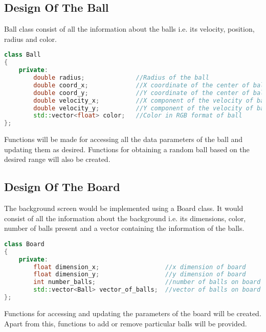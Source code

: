 \documentclass{article}
\begin{document}
\subsection{Design Of The Ball} Ball class consist of all the information about the balls i.e. its velocity, position, radius and color.


\begin{lstlisting}[language=C++, caption={Class Parameters for Ball}]
class Ball
{
	private:
		double radius;              //Radius of the ball
		double coord_x;             //X coordinate of the center of ball
		double coord_y;             //Y coordinate of the center of ball
		double velocity_x;          //X component of the velocity of ball
		double velocity_y;          //Y component of the velocity of ball
		std::vector<float> color;   //Color in RGB format of ball
};

\end{lstlisting}

Functions will be made for accessing all the data parameters of the ball and updating them as desired. Functions for obtaining a random ball based on the desired range will also be created.

\subsection{Design Of The Board} The background screen would be implemented using a Board class. It would consist of all the information about the background i.e. its dimensions, color, number of balls present and a vector containing the information of the balls.

\begin{lstlisting}[language=C++, caption={Class Parameters for Board}]
class Board
{
	private:
		float dimension_x;                  //x dimension of board
		float dimension_y;                  //y dimension of board
		int number_balls;                   //number of balls on board
		std::vector<Ball> vector_of_balls;  //vector of balls on board
};

\end{lstlisting}

Functions for accessing and updating the parameters of the board will be created. Apart from this, functions to add or remove particular balls will be provided.
\end{document}
